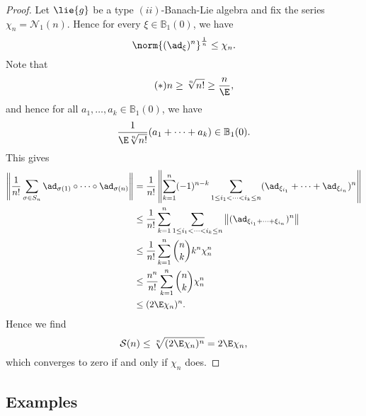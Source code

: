 \documentclass[
11pt,                          %
english                        %
]{article}
\begin{document}
\begin{proof}
	Let $\lie{g}$ be a type $(ii)$-Banach-Lie algebra and fix the series
	$\chi_n = \mathcal{N}_1(n)$. Hence for every $\xi \in \mathbb{B}_1(0)$, we have
	\begin{equation*}
		\norm{(\ad_\xi)^n}^{\frac{1}{n}}
		\leq
		\chi_n.
	\end{equation*}
	Note that 
	\begin{equation*}
		\tag{$*$}
		n \geq \sqrt[n]{n!} \geq \frac{n}{\E},
	\end{equation*}
	and hence for all $a_1, \ldots, a_k \in \mathbb{B}_1(0)$, we have
	\begin{equation*}
		\frac{1}{\E \sqrt[n]{n!}} (a_1 + \cdots + a_k)
		\in \mathbb{B}_1(0).
	\end{equation*}
	This gives
	\begin{align*}
		\left\Vert
			\frac{1}{n!}
			\sum\limits_{\sigma \in S_n}
			\ad_{\sigma(1)}
			\circ \cdots \circ
			\ad_{\sigma(n)}
		\right\Vert
		&=
		\frac{1}{n!}
		\left\Vert
			\sum\limits_{k = 1}^n
			(-1)^{n-k}
			\sum\limits_{1 \leq i_1 < \cdots < i_k \leq n}
			(\ad_{\xi_{i_1}} + \cdots + \ad_{\xi_{i_n}})^n
		\right\Vert
		\\
		& \leq
		\frac{1}{n!}
		\sum\limits_{k = 1}^n
		\sum\limits_{1 \leq i_1 < \cdots < i_k \leq n}
		\left\Vert
			(\ad_{\xi_{i_1} + \cdots + \xi_{i_n}})^n
		\right\Vert
		\\
		& \leq
		\frac{1}{n!}
		\sum\limits_{k = 1}^n
		\binom{n}{k}
		k^n \chi_n^n
		\\
		& \leq
		\frac{n^n}{n!}
		\sum\limits_{k = 1}^n
		\binom{n}{k}
		\chi_n^n
		\\
		& \leq
		(2 \E \chi_n)^n.
	\end{align*}
	Hence we find
	\begin{equation*}
		\mathcal{S}(n)
		\leq
		\sqrt[n]{(2 \E \chi_n)^n}
		=
		2 \E \chi_n,
	\end{equation*}
	which converges to zero if and only if $\chi_n$ does.
\end{proof}



\subsection{Examples}
\end{document}
